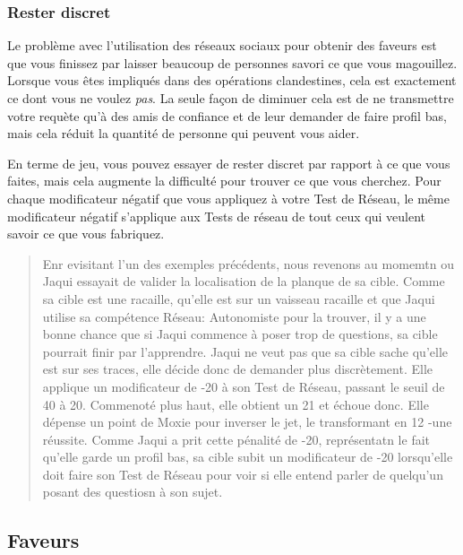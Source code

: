 \subsubsection{Rester discret} 

Le problème avec l'utilisation des réseaux sociaux pour obtenir des faveurs est que vous finissez par laisser beaucoup de personnes savori ce que vous magouillez. Lorsque vous êtes impliqués dans des opérations clandestines, cela est exactement ce dont vous ne voulez \textit{pas}. La seule façon de diminuer cela est de ne transmettre votre requète qu'à des amis de confiance et de leur demander de faire profil bas, mais cela réduit la quantité de personne qui peuvent vous aider. 

En terme de jeu, vous pouvez essayer de rester discret par rapport à ce que vous faites, mais cela augmente la difficulté pour trouver ce que vous cherchez. Pour chaque modificateur négatif que vous appliquez à votre Test de Réseau, le même modificateur négatif s'applique aux Tests de réseau de tout ceux qui veulent savoir ce que vous fabriquez. 

\begin{quotation} Enr evisitant l'un des exemples précédents, nous revenons au momemtn ou Jaqui essayait de valider la localisation de la planque de sa cible. Comme sa cible est une racaille, qu'elle est sur un vaisseau racaille et que Jaqui utilise sa compétence Réseau: Autonomiste pour la trouver, il y a une bonne chance que si Jaqui commence à poser trop de questions, sa cible pourrait finir par l'apprendre. Jaqui ne veut pas que sa cible sache qu'elle est sur ses traces, elle décide donc de demander plus discrètement. Elle applique un modificateur de -20 à son Test de Réseau, passant le seuil de 40 à 20. Commenoté plus haut, elle obtient un 21 et échoue donc. Elle dépense un point de Moxie pour inverser le jet, le transformant en 12 -une réussite. Comme Jaqui a prit cette pénalité de -20, représentatn le fait qu'elle garde un profil bas, sa cible subit un modificateur de -20 lorsqu'elle doit faire son Test de Réseau pour voir si elle entend parler de quelqu'un posant des questiosn à son sujet. \end{quotation} 

\subsection{Faveurs} 

